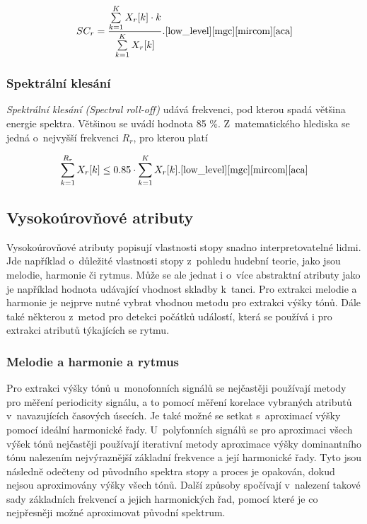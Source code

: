 \begin{equation}
	SC_r = \frac{\sum\limits_{k=1}^{K} X_r[k] \cdot k}{\sum\limits_{k=1}^{K} X_r[k]}.\text{\cite{low_level}\cite{mgc}\cite{mircom}\cite{aca}}
\end{equation}

\subsubsection*{Spektrální klesání}
\textit{Spektrální klesání (Spectral roll-off)} udává frekvenci, pod kterou spadá většina energie spektra. Většinou se uvádí hodnota 85 \%. Z~matematického hlediska se jedná o~nejvyšší frekvenci $R_r$, pro kterou platí

\begin{equation}
	\sum\limits_{k=1}^{R_r} X_r[k] \leq 0.85 \cdot \sum\limits_{k=1}^{K} X_r[k].\text{\cite{low_level}\cite{mgc}\cite{mircom}\cite{aca}}
\end{equation}

\subsection*{Vysokoúrovňové atributy}
\label{vysokourovnove_atributy}
Vysokoúrovňové atributy popisují vlastnosti stopy snadno interpretovatelné lidmi. Jde například o~důležité vlastnosti stopy z~pohledu hudební teorie, jako jsou melodie, harmonie či rytmus. Může se ale jednat i o~více abstraktní atributy jako je například hodnota udávající vhodnost skladby k~tanci. Pro extrakci melodie a harmonie je nejprve nutné vybrat vhodnou metodu pro extrakci výšky tónů. Dále také některou z~metod pro detekci počátků událostí, která se používá i pro extrakci atributů týkajících se rytmu.\cite{MIR}\cite{aca}

\subsubsection*{Melodie a harmonie a rytmus}
\label{melodie_a_harmonie_a_rytmus}
Pro extrakci výšky tónů u~monofonních signálů se nejčastěji používají metody pro měření periodicity signálu, a to pomocí měření korelace vybraných atributů v~navazujících časových úsecích. Je také možné se setkat s~aproximací výšky pomocí ideální harmonické řady. U~polyfonních signálů se pro aproximaci všech výšek tónů nejčastěji používají iterativní metody aproximace výšky dominantního tónu nalezením nejvýraznější základní frekvence a její harmonické řady. Tyto jsou následně odečteny od původního spektra stopy a proces je opakován, dokud nejsou aproximovány výšky všech tónů. Další způsoby spočívají v~nalezení takové sady základních frekvencí a jejich harmonických řad, pomocí které je co nejpřesněji možné aproximovat původní spektrum.\cite{MIR}\cite{low_level}\cite{aca}

